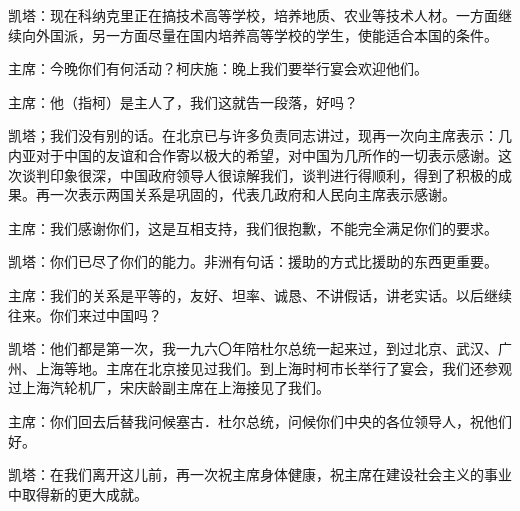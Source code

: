 凯塔：现在科纳克里正在搞技术高等学校，培养地质、农业等技术人材。一方面继续向外国派，另一方面尽量在国内培养高等学校的学生，使能适合本国的条件。

主席：今晚你们有何活动？柯庆施：晚上我们要举行宴会欢迎他们。

主席：他（指柯）是主人了，我们这就告一段落，好吗？

凯塔；我们没有别的话。在北京已与许多负责同志讲过，现再一次向主席表示：几内亚对于中国的友谊和合作寄以极大的希望，对中国为几所作的一切表示感谢。这次谈判印象很深，中国政府领导人很谅解我们，谈判进行得顺利，得到了积极的成果。再一次表示两国关系是巩固的，代表几政府和人民向主席表示感谢。

主席：我们感谢你们，这是互相支持，我们很抱歉，不能完全满足你们的要求。

凯塔：你们已尽了你们的能力。非洲有句话：援助的方式比援助的东西更重要。

主席：我们的关系是平等的，友好、坦率、诚恳、不讲假话，讲老实话。以后继续往来。你们来过中国吗？

凯塔：他们都是第一次，我一九六〇年陪杜尔总统一起来过，到过北京、武汉、广州、上海等地。主席在北京接见过我们。到上海时柯市长举行了宴会，我们还参观过上海汽轮机厂，宋庆龄副主席在上海接见了我们。

主席：你们回去后替我问候塞古．杜尔总统，问候你们中央的各位领导人，祝他们好。

凯塔：在我们离开这儿前，再一次祝主席身体健康，祝主席在建设社会主义的事业中取得新的更大成就。


